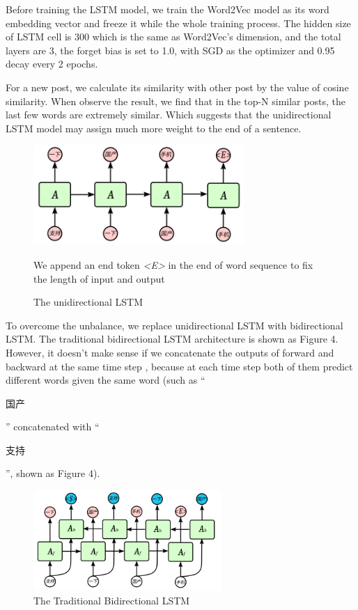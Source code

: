 \documentclass{sig-alternate}
\begin{document}
Before training the LSTM model, we train the Word2Vec model as its word embedding 
vector and freeze it while the whole training process. The hidden size of LSTM 
cell is 300 which is the same as Word2Vec’s dimension, and the total layers
are 3, the forget bias is set to 1.0, with SGD as the optimizer and 0.95 decay 
every 2 epochs. 

For a new post, we calculate its 
similarity with other post by the value of cosine similarity. When observe 
the result, we find that in the top-N similar posts, the last few words are 
extremely similar. Which suggests that the unidirectional LSTM 
model may assign much more weight to the end of a sentence. 

\begin{figure}
  \centering
  \includegraphics[height=1.5in, width=3.15in]{unilstm.png}
  \caption{The unidirectional LSTM}{We append an end token \emph{<E>} in the end of word sequence to fix the length of input and output}
\end{figure}

To overcome the unbalance, we replace unidirectional LSTM with bidirectional 
LSTM. The traditional bidirectional LSTM architecture is shown as Figure 4.
However, it doesn’t make sense if we concatenate the outputs of forward and 
backward at the same time step , because at each time step both of them
predict different words given the same word (such as “\begin{CJK}{UTF8}{gbsn}国产\end{CJK}” concatenated with “\begin{CJK}{UTF8}{gbsn}支持\end{CJK}”, shown as Figure 4).

\begin{figure}
  \centering
  \includegraphics[height=1.5in, width=2.81in]{bilstm1.png}
  \caption{The Traditional Bidirectional LSTM}
\end{figure}
\end{document}
